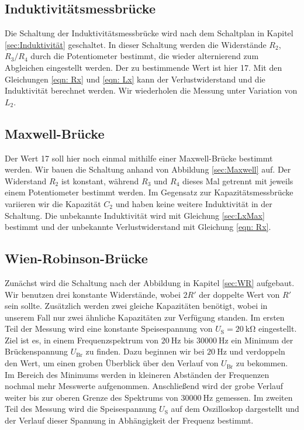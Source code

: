 \subsection{Induktivitätsmessbrücke}

    Die Schaltung der Induktivitätsmessbrücke wird nach dem Schaltplan in Kapitel \ref{sec:Induktivität} 
    geschaltet.
    In dieser Schaltung werden die Widerstände $R_2$, $R_3/R_4$ durch die Potentiometer bestimmt, die wieder 
    alternierend zum Abgleichen eingestellt werden.
    Der zu bestimmende Wert ist hier 17. 
    Mit den Gleichungen \eqref{eqn: Rx} und \eqref{eqn: Lx} kann der Verlustwiderstand und die Induktivität
    berechnet werden.
    Wir wiederholen die Messung unter Variation von $L_2$.

\subsection{Maxwell-Brücke}

    Der Wert 17 soll hier noch einmal mithilfe einer Maxwell-Brücke bestimmt werden.
    Wir bauen die Schaltung anhand von Abbildung \ref{sec:Maxwell} auf.
    Der Widerstand $R_2$ ist konstant, während $R_3$ und $R_4$ dieses Mal getrennt mit jeweils einem
    Potentiometer bestimmt werden.
    Im Gegensatz zur Kapazitätsmessbrücke variieren wir die Kapazität $C_2$ und haben keine weitere 
    Induktivität in der Schaltung.
    Die unbekannte Induktivität wird mit Gleichung \eqref{sec:LxMax} bestimmt und der unbekannte
    Verlustwiderstand mit Gleichung \eqref{eqn: Rx}.

\subsection{Wien-Robinson-Brücke}

    Zunächst wird die Schaltung nach der Abbildung in Kapitel \ref{sec:WR} aufgebaut.
    Wir benutzen drei konstante Widerstände, wobei $2R'$ der doppelte Wert von $R'$ sein sollte.
    Zusätzlich werden zwei gleiche Kapazitäten benötigt, wobei in unserem Fall nur zwei ähnliche Kapazitäten zur
    Verfügung standen.
    Im ersten Teil der Messung wird eine konstante Speisespannung von $U_\text{S} = \SI{20}{\kilo\ohm}$ eingestellt.
    Ziel ist es, in einem Frequenzspektrum von $\SI{20}{\hertz}$ bis $\SI{30000}{\hertz}$ ein 
    Minimum der Brückenspannung $U_\text{Br}$ zu finden.
    Dazu beginnen wir bei $\SI{20}{\hertz}$ und verdoppeln den Wert, um einen groben Überblick
    über den Verlauf von $U_\text{Br}$ zu bekommen. 
    Im Bereich des Minimums werden in kleineren Abständen der Frequenzen nochmal mehr Messwerte aufgenommen.
    Anschließend wird der grobe Verlauf weiter bis zur oberen Grenze des Spektrums von $\SI{30000}{\hertz}$ gemessen.
    Im zweiten Teil des Messung wird die Speisespannung $U_\text{S}$ auf dem Oszilloskop dargestellt 
    und der Verlauf dieser Spannung in Abhängigkeit der Frequenz bestimmt.

